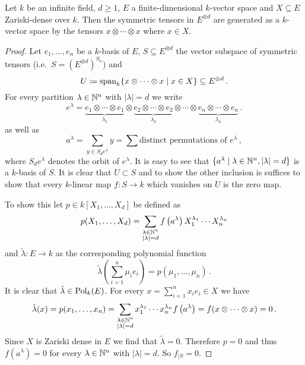 \begin{lemma}\label{lemma: symmetric tensors and zariski dense subsets}
  Let $k$ be an infinite field, $d \geq 1$, $E$ a finite-dimensional $k$-vector space and $X \subseteq E$ Zariski-dense over $k$.
  Then the symmetric tensors in $E^{\otimes d}$ are generated as a $k$-vector space by the tensors $x \otimes \dotsb \otimes x$ where $x \in X$.
\end{lemma}
\begin{proof}
  Let $e_1, \dotsc, e_n$ be a $k$-basis of $E$, $S \subseteq E^{\otimes d}$ the vector subspace of symmetric tensors (i.e.\ $S = (E^{\otimes d})^{S_n}$) and
  \[
              U
    \coloneqq \operatorname{span}_k \{ x \otimes \dotsb \otimes x \mid x \in X \}
    \subseteq E^{\otimes d} \,.
  \]
  For every partition $\lambda \in \mathbb{N}^n$ with $|\lambda| = d$ we write
  \[
      e^\lambda
    =         \underbrace{e_1 \otimes \dotsb \otimes e_1}_{\lambda_1}
      \otimes \underbrace{e_2 \otimes \dotsb \otimes e_2}_{\lambda_2}
      \otimes \dotsb
      \otimes \underbrace{e_n \otimes \dotsb \otimes e_n}_{\lambda_n} \,.
  \]
  as well as
  \[
      a^\lambda
    = \sum_{y \in S_d e^\lambda} y
    = \sum \text{distinct permutations of $e^\lambda$} \,,
  \]
  where $S_d e^\lambda$ denotes the orbit of $e^\lambda$.
  It is easy to see that $\{ a^\lambda \mid \lambda \in \mathbb{N}^n, |\lambda| = d \}$ is a $k$-basis of $S$.
  It is clear that $U \subset S$ and to show the other inclusion is suffices to show that every $k$-linear map $f \colon S \to k$ which vanishes on $U$ is the zero map.
  
  To show this let $p \in k[X_1, \dotsc, X_d]$ be defined as
  \[
      p(X_1, \dotsc, X_d)
    = \sum_{\substack{\lambda \in \mathbb{N}^n \\ |\lambda| = d}}
        f\left( a^\lambda \right)
        X_1^{\lambda_1} \dotsm X_n^{\lambda_n}
  \]
  and $\tilde{\lambda} \colon E \to k$ as the corresponding polynomial function
  \[
      \tilde{\lambda}\left( \sum_{i=1}^n \mu_i e_i \right)
    = p(\mu_1, \dotsc, \mu_n) \,.
  \]
  It is clear that $\tilde{\lambda} \in \operatorname{Pol}_k(E)$.
  For every $x = \sum_{i=1}^n x_i e_i \in X$ we have
  \[
      \tilde{\lambda}(x)
    = p(x_1, \dotsc, x_n)
    = \sum_{\substack{\lambda \in \mathbb{N}^n \\ |\lambda| = d}}
        x_1^{\lambda_1} \dotsm x_n^{\lambda_n}
        f\left( a^\lambda \right) 
    = f(x \otimes \dotsb \otimes x)
    = 0 \,.
  \]
  Since $X$ is Zariski dense in $E$ we find that $\tilde{\lambda} = 0$.
  Therefore $p = 0$ and thus $f(a^\lambda) = 0$ for every $\lambda \in \mathbb{N}^n$ with $|\lambda| = d$.
  So $f_{|S} = 0$.
\end{proof}


